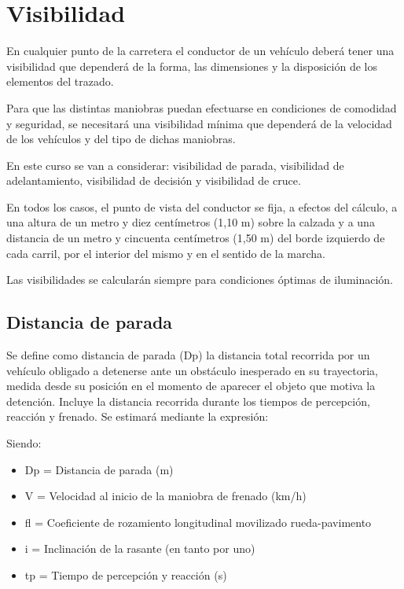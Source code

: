 \documentclass[letterpaper,10pt,english]{sphinxmanual}
\let\sphinxpxdimen\pdfpxdimen\else\newdimen\sphinxpxdimen
\begin{document}
\section{Visibilidad}
\label{\detokenize{controles:visibilidad}}
En cualquier punto de la carretera el conductor de un vehículo deberá tener una visibilidad que dependerá de la forma, las dimensiones y la disposición de los elementos del trazado.

Para que las distintas maniobras puedan efectuarse en condiciones de comodidad y seguridad, se necesitará una visibilidad mínima que dependerá de la velocidad de los vehículos y del tipo de dichas maniobras.

En este curso se van a considerar: visibilidad de parada, visibilidad de adelantamiento, visibilidad de decisión y visibilidad de cruce.

En todos los casos, el punto de vista del conductor se fija, a efectos del cálculo, a una altura de un metro y diez
centímetros (1,10 m) sobre la calzada y a una distancia de un metro y cincuenta centímetros (1,50 m) del borde izquierdo de cada carril, por el interior del mismo y en el sentido de la marcha.

Las visibilidades se calcularán siempre para condiciones óptimas de iluminación.


\subsection{Distancia de parada}
\label{\detokenize{controles:distancia-de-parada}}
Se define como distancia de parada (Dp) la distancia total recorrida por un vehículo obligado a detenerse ante un obstáculo inesperado en su trayectoria, medida desde su posición en el momento de aparecer el objeto que motiva la detención. Incluye la distancia recorrida durante los tiempos de percepción, reacción y frenado. Se estimará mediante la expresión:

\noindent\sphinxincludegraphics[width=200\sphinxpxdimen]{{formula2}.png}

Siendo:
\begin{itemize}
\item {} 
Dp = Distancia de parada (m)

\item {} 
V = Velocidad al inicio de la maniobra de frenado (km/h)

\item {} 
fl = Coeficiente de rozamiento longitudinal movilizado rueda-pavimento

\item {} 
i = Inclinación de la rasante (en tanto por uno)

\item {} 
tp = Tiempo de percepción y reacción (s)

\end{itemize}
\end{document}
